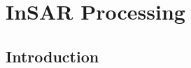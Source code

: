 \chapter{InSAR Processing}\label{chap:insar-processing}

\section{Introduction}\label{sec:insarintro}


